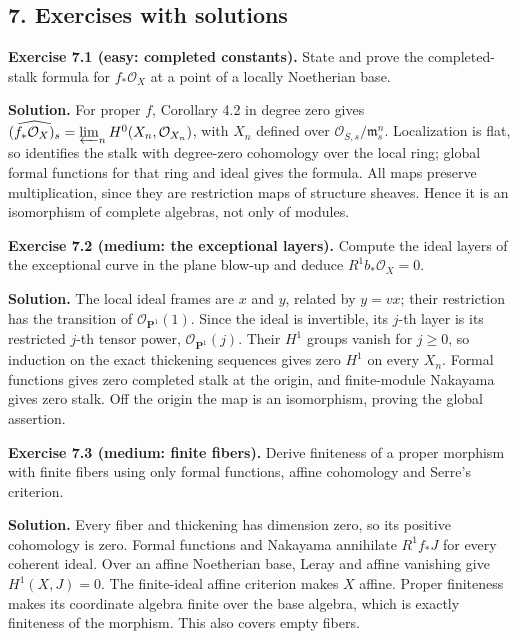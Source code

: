\documentclass[11pt]{article}
\begin{document}
\subsection{7. Exercises with solutions}\label{exercises-with-solutions}

\textbf{Exercise 7.1 (easy: completed constants).} State and prove the
completed-stalk formula for \(f_*\mathcal O_X\) at a point of a locally
Noetherian base.

\textbf{Solution.} For proper \(f\), Corollary 4.2 in degree zero gives
\(\widehat{(f_*\mathcal O_X)_s}=\varprojlim_n H^0(X_n,\mathcal O_{X_n})\),
with \(X_n\) defined over \(\mathcal O_{S,s}/\mathfrak m_s^n\).
Localization is flat, so identifies the stalk with degree-zero
cohomology over the local ring; global formal functions for that ring
and ideal gives the formula. All maps preserve multiplication, since
they are restriction maps of structure sheaves. Hence it is an
isomorphism of complete algebras, not only of modules.

\textbf{Exercise 7.2 (medium: the exceptional layers).} Compute the
ideal layers of the exceptional curve in the plane blow-up and deduce
\(R^1b_*\mathcal O_X=0\).

\textbf{Solution.} The local ideal frames are \(x\) and \(y\), related
by \(y=vx\); their restriction has the transition of
\(\mathcal O_{\mathbf P^1}(1)\). Since the ideal is invertible, its
\(j\)-th layer is its restricted \(j\)-th tensor power,
\(\mathcal O_{\mathbf P^1}(j)\). Their \(H^1\) groups vanish for
\(j\geq0\), so induction on the exact thickening sequences gives zero
\(H^1\) on every \(X_n\). Formal functions gives zero completed stalk at
the origin, and finite-module Nakayama gives zero stalk. Off the origin
the map is an isomorphism, proving the global assertion.

\textbf{Exercise 7.3 (medium: finite fibers).} Derive finiteness of a
proper morphism with finite fibers using only formal functions, affine
cohomology and Serre's criterion.

\textbf{Solution.} Every fiber and thickening has dimension zero, so its
positive cohomology is zero. Formal functions and Nakayama annihilate
\(R^1f_*J\) for every coherent ideal. Over an affine Noetherian base,
Leray and affine vanishing give \(H^1(X,J)=0\). The finite-ideal affine
criterion makes \(X\) affine. Proper finiteness makes its coordinate
algebra finite over the base algebra, which is exactly finiteness of the
morphism. This also covers empty fibers.
\end{document}
